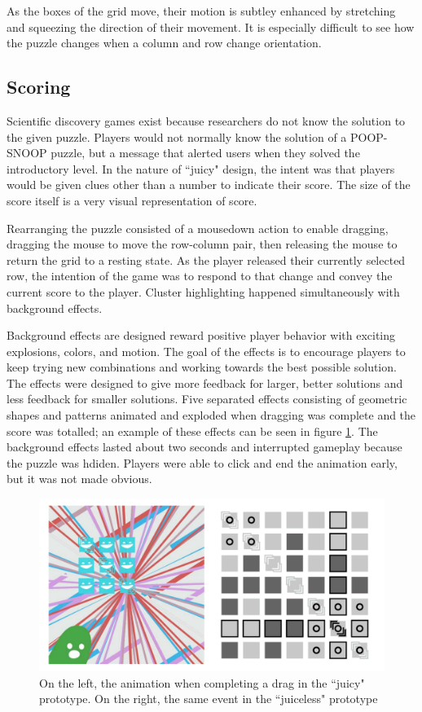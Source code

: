 As the boxes of the grid move, their motion is subtley enhanced by stretching and squeezing the direction of their movement. It is especially difficult to see how the puzzle changes when a column and row change orientation.

\subsection{Scoring}

Scientific discovery games exist because researchers do not know the solution to the given puzzle. Players would not normally know the solution of a POOP-SNOOP puzzle, but a message that alerted users when they solved the introductory level. In the nature of ``juicy" design, the intent was that players would be given clues other than a number to indicate their score. The size of the score itself is a very visual representation of score.

Rearranging the puzzle consisted of a mousedown action to enable dragging, dragging the mouse to move the row-column pair, then releasing the mouse to return the grid to a resting state. As the player released their currently selected row, the intention of the game was to respond to that change and convey the current score to the player. Cluster highlighting happened simultaneously with background effects.

Background effects are designed reward positive player behavior with exciting explosions, colors, and motion. The goal of the effects is to encourage players to keep trying new combinations and working towards the best possible solution. The effects were designed to give more feedback for larger, better solutions and less feedback for smaller solutions. Five separated effects consisting of geometric shapes and patterns animated and exploded when dragging was complete and the score was totalled; an example of these effects can be seen in figure \ref{fig:background}. The background effects lasted about two seconds and interrupted gameplay because the puzzle was hdiden. Players were able to click and end the animation early, but it was not made obvious.

\begin{figure}
\begin{center}
\includegraphics[width=150mm]{images/background.pdf}
\caption{On the left, the animation when completing a drag in the ``juicy" prototype. On the right, the same event in the ``juiceless" prototype}
\label{fig:background}
\end{center}
\end{figure}


